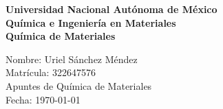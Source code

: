 \documentclass[12pt]{article}
\renewcommand{\headrulewidth}{0pt}
\newcommand{\activarEncabezado}[1]{%
  \fancyhead[L]{\small\textcolor{blueunam}{#1}}%
  \fancyhead[R]{\small\textcolor{blueunam}{\nouppercase{\leftmark}}}%
  \renewcommand{\headrulewidth}{0.4pt}%
  \renewcommand{\headrule}{\hbox to\headwidth{\color{blueunam}\leaders\hrule height \headrulewidth\hfill}}%
}
\begin{document}
\begin{titlepage}
\thispagestyle{empty}
\begin{center}
\vspace*{2cm}
\fontsize{14}{30}\selectfont\textbf{Universidad Nacional Autónoma de México} \\
\vspace{1cm}
\fontsize{14}{30}\selectfont\textbf{Química e Ingeniería en Materiales} \\
\vspace{1cm}
\fontsize{14}{30}\selectfont\textbf{Química de Materiales} \\
\end{center}
\vspace{2cm}
\begin{flushright}
    \fontsize{14}{30}\selectfont
        \hspace{2cm} Nombre: Uriel Sánchez Méndez \\
        \hspace{2cm} Matrícula: 322647576 \\
        \hspace{2cm} Apuntes de Química de Materiales \\
        \hspace{2cm} Fecha: \today \\
\end{flushright}
\end{titlepage}

\tableofcontents
\thispagestyle{empty}
\newpage










\newpage
\printbibliography[heading=bibintoc, title={Referencias}]
\printindex

\end{document}
